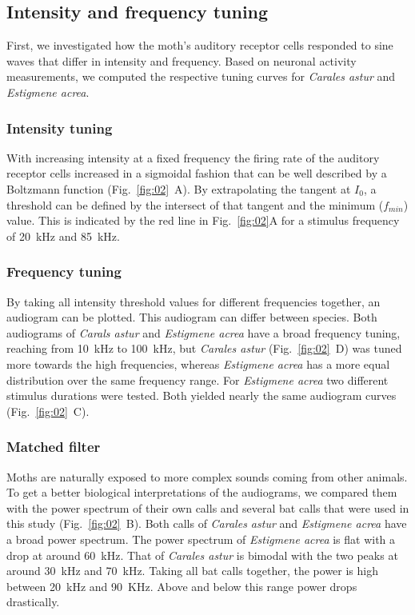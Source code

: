 \documentclass[12pt,a4paper,pdftex]{article}
\newcommand{\species}[1]{\textit{#1}}
\newcommand{\fig}[2]{(Fig.~#1~#2)}
\begin{document}
\subsection*{Intensity and frequency tuning}
First, we investigated how the moth's auditory receptor cells responded to sine waves that differ in intensity and frequency. Based on neuronal activity measurements, we computed the respective tuning curves for \species{Carales astur} and \species{Estigmene acrea}.  

\subsubsection*{Intensity tuning}
With increasing intensity at a fixed frequency the firing rate of the auditory receptor cells increased in a sigmoidal fashion that can be well described by a Boltzmann function \fig{\ref{fig:02}}{A}. By extrapolating the tangent at $I_{0}$, a threshold can be defined by the intersect of that tangent and the minimum ($f_{min}$) value. This is indicated by the red line in Fig.~\ref{fig:02}{A} for a stimulus frequency of 20~kHz and 85~kHz.  

\subsubsection*{Frequency tuning}
By taking all intensity threshold values for different frequencies together, an audiogram can be plotted. This audiogram can differ between species. Both audiograms of \species{Carals astur} and \species{Estigmene acrea} have a broad frequency tuning, reaching from 10~kHz to 100~kHz, but \species{Carales astur} \fig{\ref{fig:02}}{D} was tuned more towards the high frequencies, whereas \species{Estigmene acrea} has a more equal distribution over the same frequency range. For \species{Estigmene acrea} two different stimulus durations were tested. Both yielded nearly the same audiogram curves \fig{\ref{fig:02}}{C}.
 
\subsubsection*{Matched filter}
Moths are naturally exposed to more complex sounds coming from other animals. To get a better biological interpretations of the audiograms, we compared them with the power spectrum of their own calls and several bat calls that were used in this study \fig{\ref{fig:02}}{B}. Both calls of \species{Carales astur} and \species{Estigmene acrea} have a broad power spectrum. The power spectrum of \species{Estigmene acrea} is flat with a drop at around 60~kHz. That of \species{Carales astur} is bimodal with the two peaks at around 30~kHz and 70~kHz. Taking all bat calls together, the power is high between 20~kHz and 90~KHz. Above and below this range power drops drastically.
\end{document}
